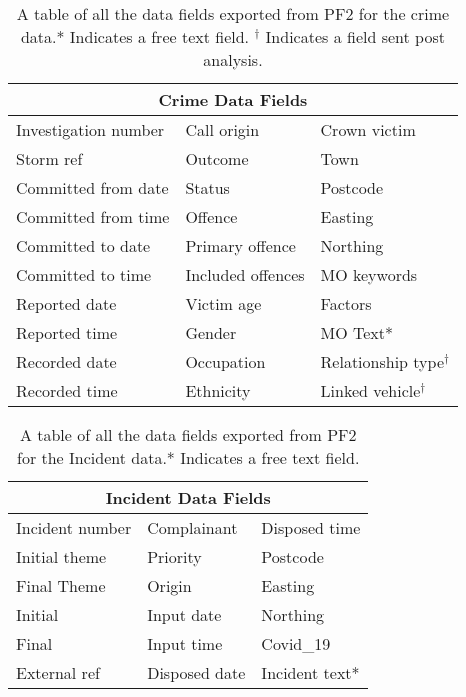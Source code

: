 \setlength{\extrarowheight}{12pt}
\begin{table}[]
\centering
\begin{tabular}{@{}lll@{}}
\toprule
\multicolumn{3}{c}{Crime Data Fields}                          \\ \midrule
Investigation number & Call origin       & Crown victim        \\
Storm ref            & Outcome           & Town                \\
Committed from date  & Status            & Postcode            \\
Committed from time  & Offence           & Easting             \\
Committed to date    & Primary offence   & Northing            \\
Committed to time    & Included offences & MO keywords         \\
Reported date        & Victim age        & Factors             \\
Reported time        & Gender            & MO Text*            \\
Recorded date        & Occupation        & Relationship type$^{\dagger}$ \\
Recorded time        & Ethnicity         & Linked vehicle$^{\dagger}$   \\ \bottomrule
\end{tabular}
\caption[PF2 crime data fields]{\label{tab:data_fields_crime} A table of all the data fields exported from PF2 for the crime data.* Indicates a free text field. $^{\dagger}$ Indicates a field sent post analysis.}
\end{table}

\begin{table}[]
\centering
\begin{tabular}{@{}lll@{}}
\toprule
\multicolumn{3}{c}{Incident Data Fields}        \\ \midrule
Incident number & Complainant   & Disposed time \\
Initial theme   & Priority      & Postcode      \\
Final Theme     & Origin        & Easting       \\
Initial         & Input date    & Northing      \\
Final           & Input time    & Covid\_19     \\
External ref    & Disposed date & Incident text*  \\ \bottomrule
\end{tabular}
\caption[PF2 incident log data fields]{\label{tab:data_fields_inc} A table of all the data fields exported from PF2 for the Incident data.* Indicates a free text field.}
\end{table}